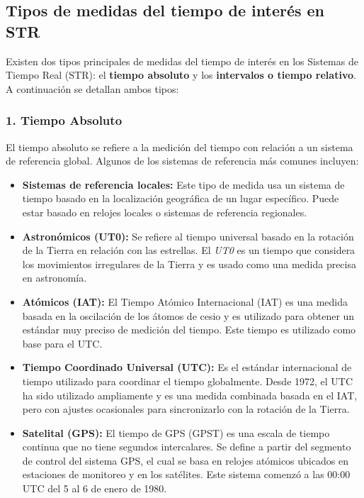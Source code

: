 \subsection{Tipos de medidas del tiempo de interés en STR}

Existen dos tipos principales de medidas del tiempo de interés en los Sistemas de Tiempo Real (STR): el \textbf{tiempo absoluto} y los \textbf{intervalos o tiempo relativo}. A continuación se detallan ambos tipos:

\subsubsection{1. Tiempo Absoluto}
El tiempo absoluto se refiere a la medición del tiempo con relación a un sistema de referencia global. Algunos de los sistemas de referencia más comunes incluyen:

\begin{itemize}
    \item \textbf{Sistemas de referencia locales:} Este tipo de medida usa un sistema de tiempo basado en la localización geográfica de un lugar específico. Puede estar basado en relojes locales o sistemas de referencia regionales.
    
    \item \textbf{Astronómicos (UT0):} Se refiere al tiempo universal basado en la rotación de la Tierra en relación con las estrellas. El \textit{UT0} es un tiempo que considera los movimientos irregulares de la Tierra y es usado como una medida precisa en astronomía.
    
    \item \textbf{Atómicos (IAT):} El Tiempo Atómico Internacional (IAT) es una medida basada en la oscilación de los átomos de cesio y es utilizado para obtener un estándar muy preciso de medición del tiempo. Este tiempo es utilizado como base para el UTC.
    
    \item \textbf{Tiempo Coordinado Universal (UTC):} Es el estándar internacional de tiempo utilizado para coordinar el tiempo globalmente. Desde 1972, el UTC ha sido utilizado ampliamente y es una medida combinada basada en el IAT, pero con ajustes ocasionales para sincronizarlo con la rotación de la Tierra.
    
    \item \textbf{Satelital (GPS):} El tiempo de GPS (GPST) es una escala de tiempo continua que no tiene segundos intercalares. Se define a partir del segmento de control del sistema GPS, el cual se basa en relojes atómicos ubicados en estaciones de monitoreo y en los satélites. Este sistema comenzó a las 00:00 UTC del 5 al 6 de enero de 1980.
\end{itemize}


